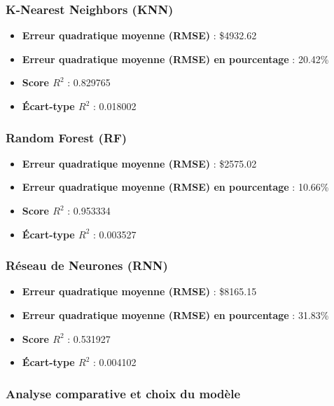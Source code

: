 \documentclass[12pt]{report}
\begin{document}
\subsubsection{K-Nearest Neighbors (KNN)}

\begin{itemize}
    \item \textbf{Erreur quadratique moyenne (RMSE)} : \$4932.62
    \item \textbf{Erreur quadratique moyenne (RMSE) en pourcentage} : 20.42\%
    \item \textbf{Score \( R^2 \)} : 0.829765
    \item \textbf{Écart-type \( R^2 \)} : 0.018002
\end{itemize}

\subsubsection{Random Forest (RF)}

\begin{itemize}
    \item \textbf{Erreur quadratique moyenne (RMSE)} : \$2575.02
    \item \textbf{Erreur quadratique moyenne (RMSE) en pourcentage} : 10.66\%
    \item \textbf{Score \( R^2 \)} : 0.953334
    \item \textbf{Écart-type \( R^2 \)} : 0.003527
\end{itemize}

\subsubsection{Réseau de Neurones (RNN)}

\begin{itemize}
    \item \textbf{Erreur quadratique moyenne (RMSE)} : \$8165.15
    \item \textbf{Erreur quadratique moyenne (RMSE) en pourcentage} : 31.83\%
    \item \textbf{Score \( R^2 \)} : 0.531927
    \item \textbf{Écart-type \( R^2 \)} : 0.004102
\end{itemize}

\subsubsection{Analyse comparative et choix du modèle}
\end{document}
